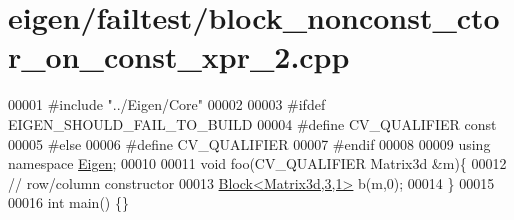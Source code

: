 \hypertarget{eigen_2failtest_2block__nonconst__ctor__on__const__xpr__2_8cpp_source}{}\section{eigen/failtest/block\+\_\+nonconst\+\_\+ctor\+\_\+on\+\_\+const\+\_\+xpr\+\_\+2.cpp}
\label{eigen_2failtest_2block__nonconst__ctor__on__const__xpr__2_8cpp_source}

\begin{DoxyCode}
00001 \textcolor{preprocessor}{#include "../Eigen/Core"}
00002 
00003 \textcolor{preprocessor}{#ifdef EIGEN\_SHOULD\_FAIL\_TO\_BUILD}
00004 \textcolor{preprocessor}{#define CV\_QUALIFIER const}
00005 \textcolor{preprocessor}{#else}
00006 \textcolor{preprocessor}{#define CV\_QUALIFIER}
00007 \textcolor{preprocessor}{#endif}
00008 
00009 \textcolor{keyword}{using namespace }\hyperlink{namespace_eigen}{Eigen};
00010 
00011 \textcolor{keywordtype}{void} foo(CV\_QUALIFIER Matrix3d &m)\{
00012     \textcolor{comment}{// row/column constructor}
00013     \hyperlink{group___core___module_class_eigen_1_1_block}{Block<Matrix3d,3,1>} b(m,0);
00014 \}
00015 
00016 \textcolor{keywordtype}{int} main() \{\}
\end{DoxyCode}
